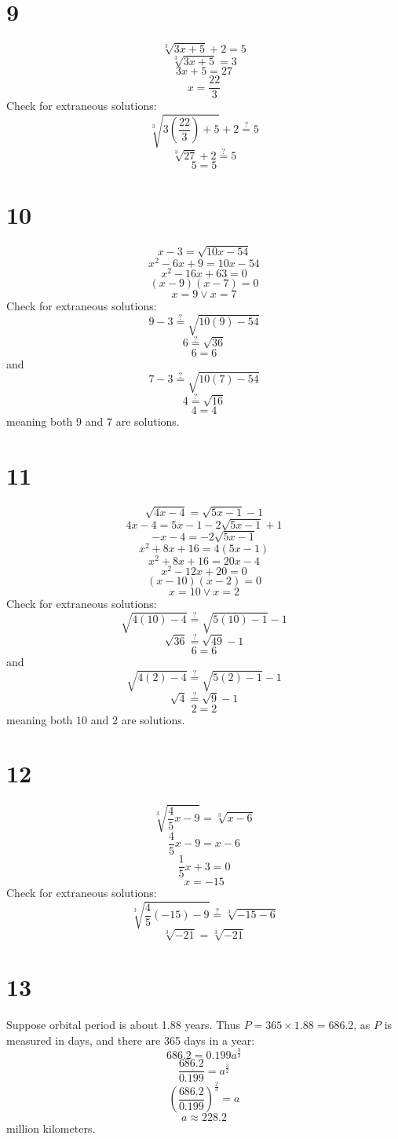 \documentclass{article}
\theoremstyle{definition}
\newcommand{\?}{\stackrel{?}{=}}
\begin{document}
\section*{9}
\[ \sqrt[3]{3x+5}+2=5 \]
\[ \sqrt[3]{3x+5}=3 \]
\[ 3x+5=27 \]
\[ x=\frac{22}{3} \]
Check for extraneous solutions:
\[ \sqrt[3]{3(\frac{22}{3})+5}+2\? 5 \]
\[ \sqrt[3]{27}+2\? 5 \]
\[ 5=5 \]

\section*{10}
\[ x-3=\sqrt{10x-54} \]
\[ x^2-6x+9=10x-54 \]
\[ x^2-16x+63=0 \]
\[ (x-9)(x-7)=0 \]
\[ x=9\vee x=7 \]
Check for extraneous solutions:
\[ 9-3\?\sqrt{10(9)-54} \]
\[ 6\?\sqrt{36} \]
\[ 6=6 \]
and \[ 7-3\?\sqrt{10(7)-54} \]
\[ 4\?\sqrt{16} \]
\[ 4=4 \]
meaning both $9$ and $7$ are solutions.

\section*{11}
\[ \sqrt{4x-4}=\sqrt{5x-1}-1 \]
\[ 4x-4=5x-1-2\sqrt{5x-1}+1 \]
\[ -x-4=-2\sqrt{5x-1} \]
\[ x^2+8x+16=4(5x-1) \]
\[ x^2+8x+16=20x-4 \]
\[ x^2-12x+20=0 \]
\[ (x-10)(x-2)=0 \]
\[ x=10\vee x=2 \]
Check for extraneous solutions:
\[ \sqrt{4(10)-4}\?\sqrt{5(10)-1}-1 \]
\[ \sqrt{36}\?\sqrt{49}-1 \]
\[ 6=6 \]
and \[ \sqrt{4(2)-4}\?\sqrt{5(2)-1}-1 \]
\[ \sqrt{4}\?\sqrt{9}-1 \]
\[ 2=2 \]
meaning both $10$ and $2$ are solutions.

\section*{12}
\[ \sqrt[3]{\frac{4}{5}x-9}=\sqrt[3]{x-6} \]
\[ \frac{4}{5}x-9=x-6 \]
\[ \frac{1}{5}x+3=0 \]
\[ x=-15 \]
Check for extraneous solutions:
\[ \sqrt[3]{\frac{4}{5}(-15)-9}\? \sqrt[3]{-15-6} \]
\[ \sqrt[3]{-21}=\sqrt[3]{-21} \]

\section*{13}
Suppose orbital period is about 1.88 years. Thus $P=365\times 1.88=686.2$, as $P$ is measured in days, and there are 365 days in a year:
\[ 686.2=0.199a^\frac{3}{2} \]
\[ \frac{686.2}{0.199}=a^\frac{3}{2} \]
\[ (\frac{686.2}{0.199})^\frac{2}{3}=a \]
\[ a\approx 228.2 \] million kilometers.
\end{document}
